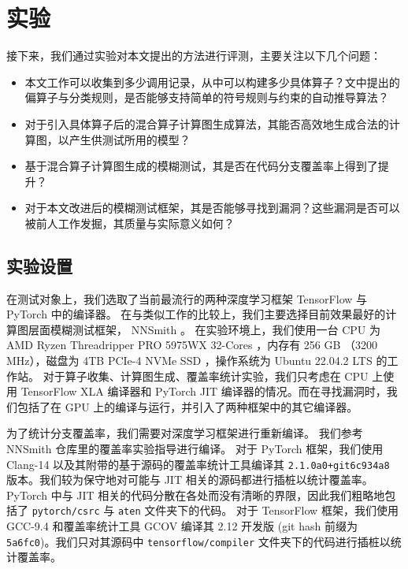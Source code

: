 
\chapter{实验}
\label{chp:exp}

接下来，我们通过实验对本文提出的方法进行评测，主要关注以下几个问题：

\begin{itemize}
    \item 本文工作可以收集到多少调用记录，从中可以构建多少具体算子？文中提出的偏算子与分类规则，是否能够支持简单的符号规则与约束的自动推导算法？
    \item 对于引入具体算子后的混合算子计算图生成算法，其能否高效地生成合法的计算图，以产生供测试所用的模型？
    \item 基于混合算子计算图生成的模糊测试，其是否在代码分支覆盖率上得到了提升？
    \item 对于本文改进后的模糊测试框架，其是否能够寻找到漏洞？这些漏洞是否可以被前人工作发掘，其质量与实际意义如何？
\end{itemize}

\section{实验设置}

在测试对象上，我们选取了当前最流行的两种深度学习框架 TensorFlow 与 PyTorch 中的编译器。
在与类似工作的比较上，我们主要选择目前效果最好的计算图层面模糊测试框架， NNSmith 。
在实验环境上，我们使用一台 CPU 为 AMD Ryzen Threadripper PRO 5975WX 32-Cores ，内存有 256 GB （3200 MHz），磁盘为 4TB PCIe-4 NVMe SSD ，操作系统为 Ubuntu 22.04.2 LTS 的工作站。
对于算子收集、计算图生成、覆盖率统计实验，我们只考虑在 CPU 上使用 TensorFlow XLA 编译器和 PyTorch JIT 编译器的情况。而在寻找漏洞时，我们包括了在 GPU 上的编译与运行，并引入了两种框架中的其它编译器。

为了统计分支覆盖率，我们需要对深度学习框架进行重新编译。
我们参考 NNSmith 仓库里的覆盖率实验指导\cite{nnsmith_expinstr}进行编译。
对于 PyTorch 框架，我们使用 Clang-14 以及其附带的基于源码的覆盖率统计工具\cite{clang14_cov}编译其 \texttt{2.1.0a0+git6c934a8} 版本。我们较为保守地对可能与 JIT 相关的源码都进行插桩以统计覆盖率。 PyTorch 中与 JIT 相关的代码分散在各处而没有清晰的界限，因此我们粗略地包括了 \texttt{pytorch/csrc} 与 \texttt{aten} 文件夹下的代码。
对于 TensorFlow 框架，我们使用 GCC-9.4 和覆盖率统计工具 GCOV\cite{gcov} 编译其 2.12 开发版 (git hash 前缀为 \texttt{5a6fc0})。我们只对其源码中 \texttt{tensorflow/compiler} 文件夹下的代码进行插桩以统计覆盖率。

